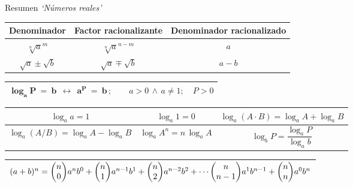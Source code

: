 \begin{myblock}{ Resumen \emph{`Números reales'}}
\begin{table}[H]
\centering
\begin{tabular}{|c|c|c|}
\hline
Denominador & Factor racionalizante & Denominador racionalizado \\ \hline
$\sqrt[n]a^m$ & $\sqrt[n]a^{n-m}$ & $a$ \\ \hline
$\sqrt{a} \pm \sqrt{b}$ & $\sqrt{a} \mp \sqrt{b}$ & $a-b$ \\ \hline
\end{tabular}
\end{table}	

\vspace{5mm}

\begin{table}[H]
\centering
\begin{tabular}{|c|}
\hline
$\boldsymbol{ \log_aP\ = \ b \ \ \leftrightarrow \ \ a^P\ = \ b } \, ; \qquad a>0 \, \wedge \, a\neq 1 ;\quad P>0$
 \\ \hline
\end{tabular}
\end{table}

\begin{table}[H]
\centering
\begin{tabular}{|c|c|c|}
\hline
$\log_aa=1$ & $\log_a1=0$ & $\log_a(A\cdot B)=\log_aA+\log_aB$ \\ \hline
$\log_a(A / B)=\log_aA-\log_aB$ & $\log_aA^n=n\, \log_aA$ & $\log_bP=\dfrac{\log_aP}{\log_ab}$ \\ \hline
\end{tabular}
\end{table}	
\vspace{5mm}

\begin{table}[H]
\centering
\begin{tabular}{|c|}
\hline
  $(a+b)^n  = \mqty(n\\0)a^nb^0+\mqty(n\\1)a^{n-1}b^1+\mqty(n\\2)a^{n-2}b^2+ \cdots \mqty(n\\n-1)a^1b^{n-1}+\mqty(n\\n)a^0b^n $ \\ \hline
\end{tabular}
\end{table}
\end{myblock}












